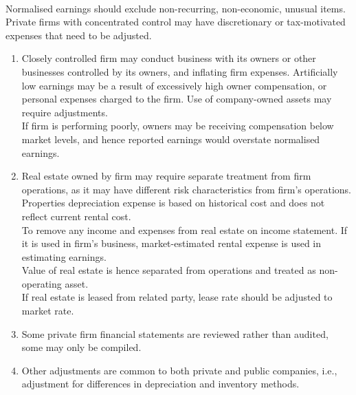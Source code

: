 \begin{remark} \\
Normalised earnings should exclude non-recurring, non-economic, unusual items. Private firms with concentrated control may have discretionary or tax-motivated expenses that need to be adjusted.
\begin{enumerate}[label=\roman*.]
\setlength{\itemsep}{0pt}
\item Closely controlled firm may conduct business with its owners or other businesses controlled by its owners, and inflating firm expenses. Artificially low earnings may be a result of excessively high owner compensation, or personal expenses charged to the firm. Use of company-owned assets may require adjustments.\\
If firm is performing poorly, owners may be receiving compensation below market levels, and hence reported earnings would overstate normalised earnings.
\item Real estate owned by firm may require separate treatment from firm operations, as it may have different risk characteristics from firm's operations.\\
Properties depreciation expense is based on historical cost and does not reflect current rental cost.\\
To remove any income and expenses from real estate on income statement. If it is used in firm's business, market-estimated rental expense is used in estimating earnings.\\
Value of real estate is hence separated from operations and treated as non-operating asset.\\
If real estate is leased from related party, lease rate should be adjusted to market rate.
\item Some private firm financial statements are reviewed rather than audited, some may only be compiled.
\item Other adjustments are common to both private and public companies, i.e., adjustment for differences in depreciation and inventory methods.
\end{enumerate}
\end{remark}

